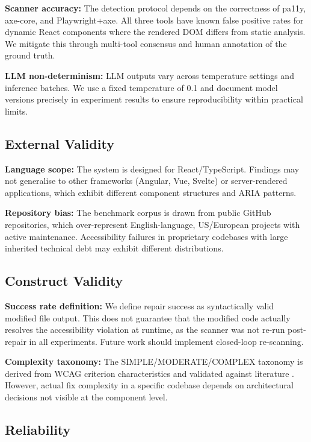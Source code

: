 \documentclass[10pt,conference]{IEEEtran}
\begin{document}
\textbf{Scanner accuracy:} The detection protocol depends on the correctness
of pa11y, axe-core, and Playwright+axe.  All three tools have known false
positive rates for dynamic React components where the rendered DOM differs
from static analysis.  We mitigate this through multi-tool consensus and
human annotation of the ground truth.

\textbf{LLM non-determinism:} LLM outputs vary across temperature settings
and inference batches.  We use a fixed temperature of 0.1 and document model
versions precisely in experiment results to ensure reproducibility within
practical limits.

\subsection{External Validity}

\textbf{Language scope:} The system is designed for React/TypeScript.
Findings may not generalise to other frameworks (Angular, Vue, Svelte) or
server-rendered applications, which exhibit different component structures and
ARIA patterns.

\textbf{Repository bias:} The benchmark corpus is drawn from public GitHub
repositories, which over-represent English-language, US/European projects
with active maintenance.  Accessibility failures in proprietary codebases
with large inherited technical debt may exhibit different distributions.

\subsection{Construct Validity}

\textbf{Success rate definition:} We define repair success as syntactically
valid modified file output.  This does not guarantee that the modified code
actually resolves the accessibility violation at runtime, as the scanner was
not re-run post-repair in all experiments.  Future work should implement
closed-loop re-scanning.

\textbf{Complexity taxonomy:} The SIMPLE/MODERATE/COMPLEX taxonomy is
derived from WCAG criterion characteristics and validated against literature
\cite{alshayban2020}.  However, actual fix complexity in a specific codebase
depends on architectural decisions not visible at the component level.

\subsection{Reliability}
\end{document}

